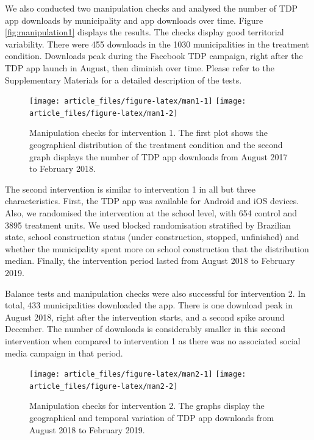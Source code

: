 \documentclass[12pt,a4paper,]{article}
\begin{document}
We also conducted two manipulation checks and analysed the number of TDP
app downloads by municipality and app downloads over time. Figure
\ref{fig:manipulation1} displays the results. The checks display good
territorial variability. There were 455 downloads in the 1030
municipalities in the treatment condition. Downloads peak during the
Facebook TDP campaign, right after the TDP app launch in August, then
diminish over time. Please refer to the Supplementary Materials for a
detailed description of the tests.

\begin{figure}

{\centering \texttt{[image: article\_files/figure-latex/man1-1]} \texttt{[image: article\_files/figure-latex/man1-2]} 

}

\caption{\label{fig:manipulation1}Manipulation checks for intervention 1. The first plot shows the geographical distribution of the treatment condition and the second graph displays the number of TDP app downloads from August 2017 to February 2018.}\label{fig:man1}
\end{figure}

The second intervention is similar to intervention 1 in all but three
characteristics. First, the TDP app was available for Android and iOS
devices. Also, we randomised the intervention at the school level, with
654 control and 3895 treatment units. We used blocked randomisation
stratified by Brazilian state, school construction status (under
construction, stopped, unfinished) and whether the municipality spent
more on school construction that the distribution median. Finally, the
intervention period lasted from August 2018 to February 2019.

Balance tests and manipulation checks were also successful for
intervention 2. In total, 433 municipalities downloaded the app. There
is one download peak in August 2018, right after the intervention
starts, and a second spike around December. The number of downloads is
considerably smaller in this second intervention when compared to
intervention 1 as there was no associated social media campaign in that
period.

\begin{figure}

{\centering \texttt{[image: article\_files/figure-latex/man2-1]} \texttt{[image: article\_files/figure-latex/man2-2]} 

}

\caption{\label{fig:manipulation2}Manipulation checks for intervention 2. The graphs display the geographical and temporal variation of TDP app downloads from August 2018 to February 2019.}\label{fig:man2}
\end{figure}
\end{document}
